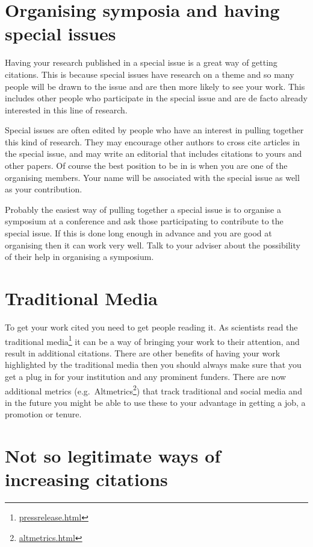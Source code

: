 \documentclass[
]{krantz}
\renewcommand{\href}[2]{#2\footnote{\url{#1}}}
\begin{document}
\hypertarget{organising-symposia-and-having-special-issues}{%
\section{Organising symposia and having special issues}\label{organising-symposia-and-having-special-issues}}

Having your research published in a special issue is a great way of getting citations. This is because special issues have research on a theme and so many people will be drawn to the issue and are then more likely to see your work. This includes other people who participate in the special issue and are de facto already interested in this line of research.

Special issues are often edited by people who have an interest in pulling together this kind of research. They may encourage other authors to cross cite articles in the special issue, and may write an editorial that includes citations to yours and other papers. Of course the best position to be in is when you are one of the organising members. Your name will be associated with the special issue as well as your contribution.

Probably the easiest way of pulling together a special issue is to organise a symposium at a conference and ask those participating to contribute to the special issue. If this is done long enough in advance and you are good at organising then it can work very well. Talk to your adviser about the possibility of their help in organising a symposium.

\hypertarget{traditional-media}{%
\section{Traditional Media}\label{traditional-media}}

To get your work cited you need to get people reading it. As scientists read the \href{pressrelease.html}{traditional media} it can be a way of bringing your work to their attention, and result in additional citations. There are other benefits of having your work highlighted by the traditional media then you should always make sure that you get a plug in for your institution and any prominent funders. There are now additional metrics (e.g.~\href{altmetrics.html}{Altmetrics}) that track traditional and social media and in the future you might be able to use these to your advantage in getting a job, a promotion or tenure.

\hypertarget{not-so-legitimate-ways-of-increasing-citations}{%
\section{Not so legitimate ways of increasing citations}\label{not-so-legitimate-ways-of-increasing-citations}}
\end{document}
